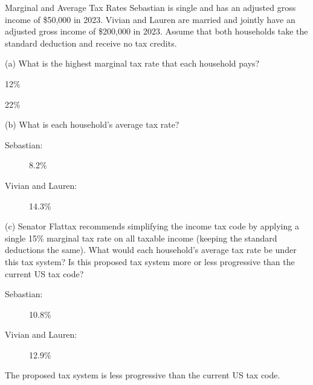 \documentclass[10pt]{extarticle}
\title{}
\author{}
\date{}
\begin{document}
  \begin{problem}{Marginal and Average Tax Rates}
    Sebastian is single and has an adjusted gross income of \$50,000 in 2023. Vivian and Lauren are married and jointly have an adjusted gross income of \$200,000 in 2023. Assume that both households take the standard deduction and receive no tax credits.
    \begin{problem}{(a)}
      What is the highest marginal tax rate that each household pays?
      \tcblower
      \begin{description}[font=\normalfont]
        \item[Sebastian:] 12\%
        \item[Vivian and Lauren:] 22\%
      \end{description}
    \end{problem}
    \begin{problem}{(b)}
      What is each household's average tax rate?
      \tcblower
      \begin{description}
        \item[Sebastian:] 8.2\%
        \item[Vivian and Lauren:] 14.3\%
      \end{description}
    \end{problem}
    \begin{problem}{(c)}
      Senator Flattax recommends simplifying the income tax code by applying a single 15\% marginal tax rate on all taxable income (keeping the standard deductions the same). What would each household's average tax rate be under this tax system? Is this proposed tax system more or less progressive than the current US tax code?
      \tcblower
      \begin{description}
        \item[Sebastian:] 10.8\%
        \item[Vivian and Lauren:] 12.9\%
      \end{description}
      The proposed tax system is less progressive than the current US tax code.
    \end{problem}
  \end{problem}
\end{document}
